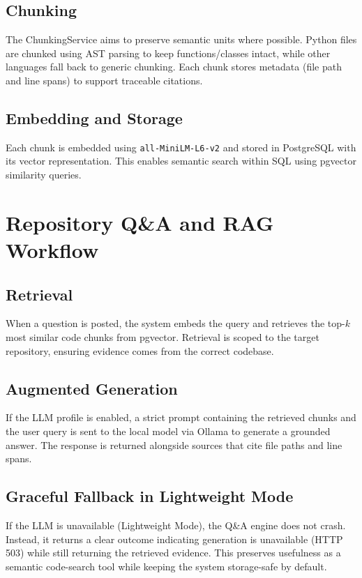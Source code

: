\documentclass[11pt,a4paper]{article}
\begin{document}
\subsection{Chunking}
The ChunkingService aims to preserve semantic units where possible. Python files are chunked using AST parsing to keep functions/classes intact, while other languages fall back to generic chunking. Each chunk stores metadata (file path and line spans) to support traceable citations.

\subsection{Embedding and Storage}
Each chunk is embedded using \texttt{all-MiniLM-L6-v2} and stored in PostgreSQL with its vector representation. This enables semantic search within SQL using pgvector similarity queries.

\section{Repository Q\&A and RAG Workflow}

\subsection{Retrieval}
When a question is posted, the system embeds the query and retrieves the top-$k$ most similar code chunks from pgvector. Retrieval is scoped to the target repository, ensuring evidence comes from the correct codebase.

\subsection{Augmented Generation}
If the LLM profile is enabled, a strict prompt containing the retrieved chunks and the user query is sent to the local model via Ollama to generate a grounded answer. The response is returned alongside sources that cite file paths and line spans.

\subsection{Graceful Fallback in Lightweight Mode}
If the LLM is unavailable (Lightweight Mode), the Q\&A engine does not crash. Instead, it returns a clear outcome indicating generation is unavailable (HTTP 503) while still returning the retrieved evidence. This preserves usefulness as a semantic code-search tool while keeping the system storage-safe by default.
\end{document}
